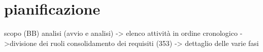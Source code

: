 \section{pianificazione}
	scopo (BB)
	analisi (avvio e analisi)
		-> elenco attività in ordine cronologico
		->divisione dei ruoli
	consolidamento dei requisiti (353)
	-> dettaglio delle varie fasi